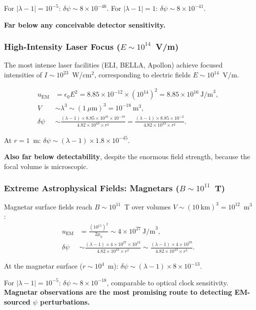\documentclass[11pt]{article}
\newcommand{\ee}[1]{\times 10^{#1}}
\newcommand{\lam}{\lambda}
\newcommand{\lbone}{|\lambda - 1|}
\newcommand{\dpsi}{\delta\psi}
\begin{document}
For $\lbone = 10^{-5}$: $\dpsi \sim 8\ee{-46}$.
For $\lbone = 1$: $\dpsi \sim 8\ee{-41}$.

\textbf{Far below any conceivable detector sensitivity.}

\subsubsection{High-Intensity Laser Focus ($E \sim 10^{14}$~V/m)}

The most intense laser facilities (ELI, BELLA, Apollon) achieve
focused intensities of $I \sim 10^{23}$~W/cm$^2$, corresponding
to electric fields $E \sim 10^{14}$~V/m.

\begin{align}
u_{\text{EM}} &= \epsilon_0 E^2
= 8.85\ee{-12} \times (10^{14})^2
= 8.85\ee{16}~\text{J/m}^3, \\
V &\sim \lambda^3 \sim (1~\mu\text{m})^3 = 10^{-18}~\text{m}^3, \\
\dpsi &\sim \frac{(\lam-1) \times 8.85\ee{16} \times 10^{-18}}
{4.82\ee{43} \times r^2}
= \frac{(\lam-1) \times 8.85\ee{-2}}{4.82\ee{43} \times r^2}.
\end{align}

At $r = 1$~m: $\dpsi \sim (\lam - 1) \times 1.8\ee{-45}$.

\textbf{Also far below detectability}, despite the enormous field
strength, because the focal volume is microscopic.

\subsubsection{Extreme Astrophysical Fields: Magnetars ($B \sim 10^{11}$~T)}

Magnetar surface fields reach $B \sim 10^{11}$~T over volumes
$V \sim (10~\text{km})^3 = 10^{12}$~m$^3$:
\begin{align}
u_{\text{EM}} &= \frac{(10^{11})^2}{2\mu_0}
\sim 4\ee{27}~\text{J/m}^3, \\
\dpsi &\sim \frac{(\lam-1) \times 4\ee{27} \times 10^{12}}
{4.82\ee{43} \times r^2}
\sim \frac{(\lam-1) \times 4\ee{39}}{4.82\ee{43} \times r^2}.
\end{align}

At the magnetar surface ($r \sim 10^4$~m):
$\dpsi \sim (\lam - 1) \times 8\ee{-13}$.

For $\lbone = 10^{-5}$: $\dpsi \sim 8\ee{-18}$, comparable
to optical clock sensitivity.  \textbf{Magnetar observations are
the most promising route to detecting EM-sourced $\psi$ perturbations.}
\end{document}
